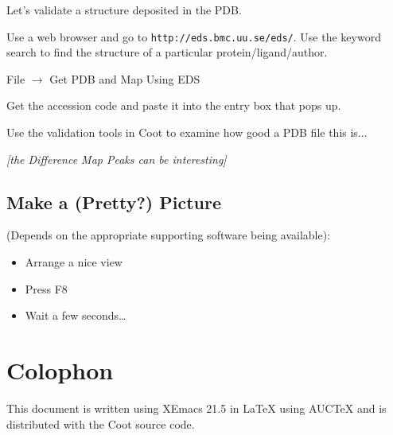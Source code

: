 \documentclass{article}
\begin{document}
\begin{trivlist}
\item Let's validate a structure deposited in the PDB.

\item Use a web browser and go to \texttt{http://eds.bmc.uu.se/eds/}.  Use
the keyword search to find the structure of a particular
protein/ligand/author.  

\item \textsf{File $\rightarrow$ Get PDB and Map Using EDS}
  
\item Get the accession code and paste it into the entry box that pops
  up.
  
\item Use the validation tools in Coot to examine how good a PDB file
  this is... 

\item \emph{[the Difference Map Peaks can be interesting]}

\end{trivlist}


\subsection{Make a (Pretty?) Picture}

(Depends on the appropriate supporting software being available):

\begin{itemize}
\item Arrange a nice view
\item Press F8
\item Wait a few seconds\ldots
\end{itemize}


\section*{Colophon}

This document is written using XEmacs 21.5 in \LaTeX{} using AUC\TeX{}
and is distributed with the Coot source code.
\end{document}
